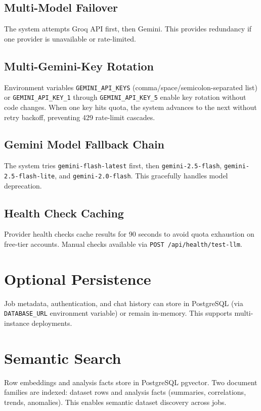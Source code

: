 \documentclass[12pt,a4paper,openany]{report}
\begin{document}
\subsection{Multi-Model Failover}

The system attempts Groq API first, then Gemini. This provides redundancy if one provider is unavailable or rate-limited.

\subsection{Multi-Gemini-Key Rotation}

Environment variables \texttt{GEMINI\_API\_KEYS} (comma/space/semicolon-separated list) or \texttt{GEMINI\_API\_KEY\_1} through \texttt{GEMINI\_API\_KEY\_5} enable key rotation without code changes. When one key hits quota, the system advances to the next without retry backoff, preventing 429 rate-limit cascades.

\subsection{Gemini Model Fallback Chain}

The system tries \texttt{gemini-flash-latest} first, then \texttt{gemini-2.5-flash}, \texttt{gemini-2.5-flash-lite}, and \texttt{gemini-2.0-flash}. This gracefully handles model deprecation.

\subsection{Health Check Caching}

Provider health checks cache results for 90 seconds to avoid quota exhaustion on free-tier accounts. Manual checks available via \texttt{POST /api/health/test-llm}.

\section{Optional Persistence}

Job metadata, authentication, and chat history can store in PostgreSQL (via \texttt{DATABASE\_URL} environment variable) or remain in-memory. This supports multi-instance deployments.

\section{Semantic Search}

Row embeddings and analysis facts store in PostgreSQL pgvector. Two document families are indexed: dataset rows and analysis facts (summaries, correlations, trends, anomalies). This enables semantic dataset discovery across jobs.
\end{document}
